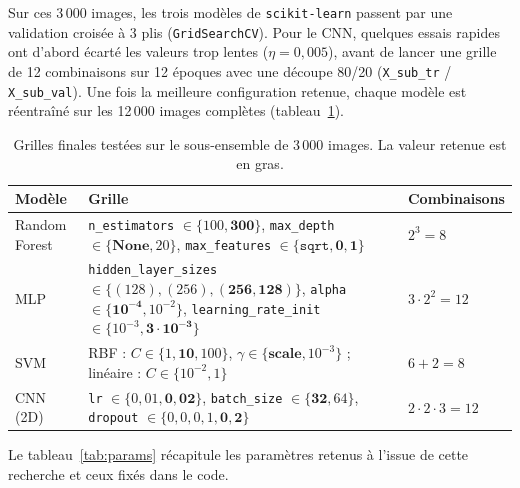 \documentclass[10pt,a4paper]{article}
\begin{document}
Sur ces 3\,000 images, les trois modèles de \texttt{scikit-learn} passent par une validation croisée à 3 plis (\texttt{GridSearchCV}). Pour le CNN, quelques essais rapides ont d'abord écarté les valeurs trop lentes ($\eta=0{,}005$), avant de lancer une grille de 12 combinaisons sur 12 époques avec une découpe 80/20 (\texttt{X\_sub\_tr} / \texttt{X\_sub\_val}). Une fois la meilleure configuration retenue, chaque modèle est réentraîné sur les 12\,000 images complètes (tableau~\ref{tab:grilles}).

\begin{table}[H]
\centering
\caption{Grilles finales testées sur le sous-ensemble de 3\,000 images. La valeur retenue est en gras.}
\label{tab:grilles}
\small
\begin{tabular}{p{2.3cm}p{6.7cm}p{2.9cm}}
\toprule
\textbf{Modèle} & \textbf{Grille} & \textbf{Combinaisons} \\
\midrule
Random Forest & \texttt{n\_estimators} $\in\{100,\mathbf{300}\}$, \texttt{max\_depth} $\in\{\mathbf{None},20\}$, \texttt{max\_features} $\in\{\texttt{sqrt},\mathbf{0{,}1}\}$ & $2^3=8$ \\
\addlinespace
MLP & \texttt{hidden\_layer\_sizes} $\in\{(128),(256),\mathbf{(256,128)}\}$, \texttt{alpha} $\in\{\mathbf{10^{-4}},10^{-2}\}$, \texttt{learning\_rate\_init} $\in\{10^{-3},\mathbf{3\cdot10^{-3}}\}$ & $3\cdot2^2=12$ \\
\addlinespace
SVM & RBF : $C\in\{1,\mathbf{10},100\}$, $\gamma\in\{\mathbf{scale},10^{-3}\}$ ; linéaire : $C\in\{10^{-2},1\}$ & $6+2=8$ \\
\addlinespace
CNN (2D) & \texttt{lr} $\in\{0{,}01,\mathbf{0{,}02}\}$, \texttt{batch\_size} $\in\{\mathbf{32},64\}$, \texttt{dropout} $\in\{0{,}0,0{,}1,\mathbf{0{,}2}\}$ & $2\cdot2\cdot3=12$ \\
\bottomrule
\end{tabular}
\end{table}

Le tableau~\ref{tab:params} récapitule les paramètres retenus à l'issue de cette recherche et ceux fixés dans le code.
\end{document}
